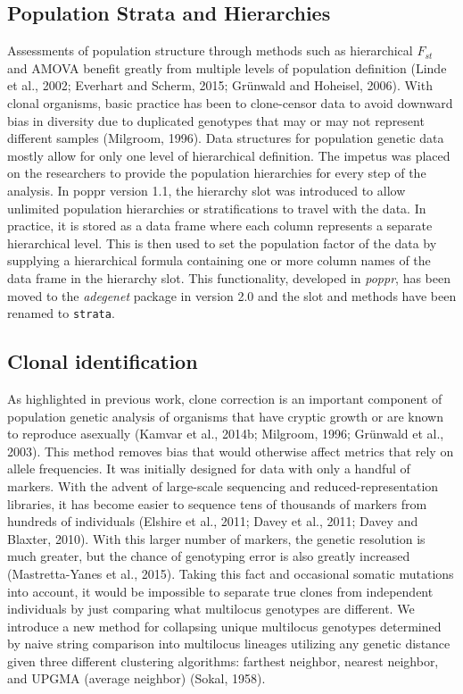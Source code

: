 \documentclass{frontiersSCNS} %
\begin{document}
\subsection*{Population Strata and
Hierarchies}\label{population-strata-and-hierarchies}

Assessments of population structure through methods such as hierarchical
\(F_{st}\) and AMOVA benefit greatly from multiple levels of population
definition (Linde et al., 2002; Everhart and Scherm, 2015; Gr{ü}nwald
and Hoheisel, 2006). With clonal organisms, basic practice has been to
clone-censor data to avoid downward bias in diversity due to duplicated
genotypes that may or may not represent different samples (Milgroom,
1996). Data structures for population genetic data mostly allow for only
one level of hierarchical definition. The impetus was placed on the
researchers to provide the population hierarchies for every step of the
analysis. In poppr version 1.1, the hierarchy slot was introduced to
allow unlimited population hierarchies or stratifications to travel with
the data. In practice, it is stored as a data frame where each column
represents a separate hierarchical level. This is then used to set the
population factor of the data by supplying a hierarchical formula
containing one or more column names of the data frame in the hierarchy
slot. This functionality, developed in \emph{poppr}, has been moved to
the \emph{adegenet} package in version 2.0 and the slot and methods have
been renamed to \texttt{strata}.

\subsection*{Clonal identification}\label{clonal-identification}

As highlighted in previous work, clone correction is an important
component of population genetic analysis of organisms that have cryptic
growth or are known to reproduce asexually (Kamvar et al., 2014b;
Milgroom, 1996; Grünwald et al., 2003). This method removes bias that
would otherwise affect metrics that rely on allele frequencies. It was
initially designed for data with only a handful of markers. With the
advent of large-scale sequencing and reduced-representation libraries,
it has become easier to sequence tens of thousands of markers from
hundreds of individuals (Elshire et al., 2011; Davey et al., 2011; Davey
and Blaxter, 2010). With this larger number of markers, the genetic
resolution is much greater, but the chance of genotyping error is also
greatly increased (Mastretta-Yanes et al., 2015). Taking this fact and
occasional somatic mutations into account, it would be impossible to
separate true clones from independent individuals by just comparing what
multilocus genotypes are different. We introduce a new method for
collapsing unique multilocus genotypes determined by naive string
comparison into multilocus lineages utilizing any genetic distance given
three different clustering algorithms: farthest neighbor, nearest
neighbor, and UPGMA (average neighbor) (Sokal, 1958).
\end{document}
